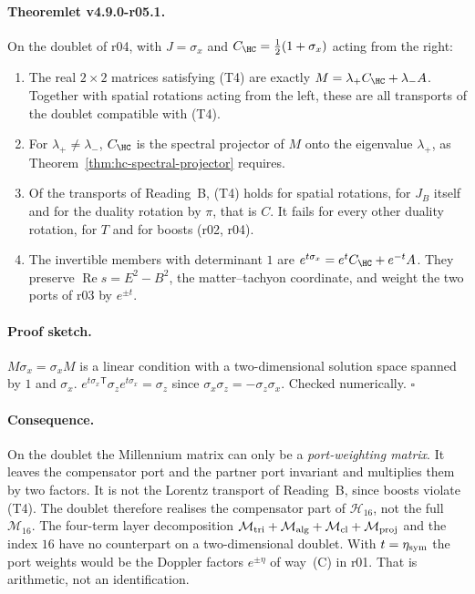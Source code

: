 \paragraph{Theoremlet v4.9.0-r05.1.}
On the doublet of r04, with \(J=\sigma_x\) and \(C_{\HC}=\tfrac12(1+\sigma_x)\) acting from the right:
\begin{enumerate}[leftmargin=2em]
\item[(a)] The real \(2\times2\) matrices satisfying (T4) are exactly \(M=\lambda_+C_{\HC}+\lambda_-A\).  Together with
spatial rotations acting from the left, these are all transports of the doublet compatible with (T4).
\item[(b)] For \(\lambda_+\neq\lambda_-\), \(C_{\HC}\) is the spectral projector of \(M\) onto the eigenvalue \(\lambda_+\),
as Theorem~\ref{thm:hc-spectral-projector} requires.
\item[(c)] Of the transports of Reading~B, (T4) holds for spatial rotations, for \(J_B\) itself and for the duality
rotation by \(\pi\), that is \(C\).  It fails for every other duality rotation, for \(T\) and for boosts (r02, r04).
\item[(d)] The invertible members with determinant \(1\) are \(e^{t\sigma_x}=e^{t}C_{\HC}+e^{-t}A\).  They preserve
\(\operatorname{Re}s=E^2-B^2\), the matter--tachyon coordinate, and weight the two ports of r03 by \(e^{\pm t}\).
\end{enumerate}

\paragraph{Proof sketch.}
\(M\sigma_x=\sigma_xM\) is a linear condition with a two-dimensional solution space spanned by \(1\) and \(\sigma_x\).
\(e^{t\sigma_x}{}^{\mathsf T}\sigma_ze^{t\sigma_x}=\sigma_z\) since \(\sigma_x\sigma_z=-\sigma_z\sigma_x\).  Checked
numerically.  \(\square\)

\paragraph{Consequence.}
On the doublet the Millennium matrix can only be a \emph{port-weighting matrix}.  It leaves the compensator port and the
partner port invariant and multiplies them by two factors.  It is not the Lorentz transport of Reading~B, since boosts
violate (T4).  The doublet therefore realises the compensator part of \(\mathcal H_{16}\), not the full \(\mathcal M_{16}\).
The four-term layer decomposition \(\mathcal M_{\rm tri}+\mathcal M_{\rm alg}+\mathcal M_{\rm cl}+\mathcal M_{\rm proj}\)
and the index \(16\) have no counterpart on a two-dimensional doublet.  With \(t=\eta_{\rm sym}\) the port weights would be
the Doppler factors \(e^{\pm\eta}\) of way~(C) in r01.  That is arithmetic, not an identification.

